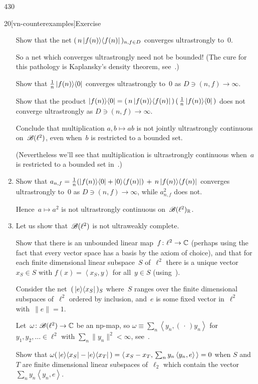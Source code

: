 \begin{parsec}{430}
\begin{point}{20}[vn-counterexamples]{Exercise}
\begin{enumerate}
Show that the net $(\, n\left|f(n)\right>\!\left<f(n)\right|\,)_{n,f\in D}$
converges ultrastrongly to~$0$.

So a net which converges ultrastrongly need not be bounded!
(The cure for this pathology is Kaplansky's density theorem, 
see~.)

Show that $\frac{1}{n} \left|f(n)\right>\!\left<0\right|$
converges ultrastrongly to~$0$ as $D\ni(n,f)\to \infty$.

Show that the product
$\left|f(n)\right>\!\left<0\right| = (\,n\left|f(n)\right>\!\left<f(n)\right|\,)\,(\,\frac{1}{n}
\left|f(n)\right>\!\left<0\right|\,)$
does not converge ultrastrongly 
as $D\ni(n,f)\to\infty$.

Conclude that multiplication $a,b\mapsto ab$
is not jointly ultrastrongly continuous on~$\mathscr{B}(\ell^2)$,
even when~$b$ is restricted to a bounded set.

(Nevertheless we'll see that multiplication is ultrastrongly continuous
when~$a$ is restricted to a bounded set in~.)

\item
Show that
$a_{n,f} = \frac{1}{n}(\left|f(n)\right>\!\left<0\right|+\left|0\right>\!\left<f(n)\right|)
\,+\, n\left|f(n)\right>\!\left<f(n)\right|$
converges ultrastrongly to~$0$
as $D\ni(n,f)\to\infty$,
while $a_{n,f}^2$ does not.

Hence~$a\mapsto a^2$ is not ultrastrongly continuous on~$\mathscr{B}(\ell^2)_{\mathbb{R}}$.

\item
Let us show that~$\mathscr{B}(\ell^2)$
is not ultraweakly complete.

Show that there is an unbounded linear map~$f\colon \ell^2\to\mathbb{C}$
(perhaps using the fact that every vector space
has a basis by the axiom of choice),
and that for each finite dimensional linear subspace~$S$ of~$\ell^2$
there is a unique vector~$x_S\in S$ 
with
$f(x)=\left<x_S,y\right>$ for all~$y\in S$
(using~).

Consider the net~$(\,\left|e\right>\!\left<x_S\right|\,)_S$
where~$S$ ranges over the finite dimensional subspaces of~$\ell^2$
ordered by inclusion,
and~$e$ is some fixed vector in~$\ell^2$ with~$\|e\|=1$.

Let~$\omega\colon \mathscr{B}(\ell^2)\to\mathbb{C}$
be an np-map,
so $\omega\equiv \sum_n \left<y_n,(\,\cdot\,)y_n\right>$
for $y_1,y_2,\dotsc \in \ell^2$ with $\sum_n \|y_n\|^2 <\infty$,
see~.

Show that $\omega(\,\left|e\right>\!\left<x_S\right|-\left|e\right>\!\left<x_T\right|\,)
= \left<\,x_S-x_T,\,\sum_n y_n\left<y_n,e\right>\,\right> = 0$
when $S$ and~$T$ are finite dimensional linear subspaces of~$\ell_2$
which contain the vector $\sum_n y_n\left<y_n,e\right>$.


\end{enumerate}
\end{point}
\end{parsec}
